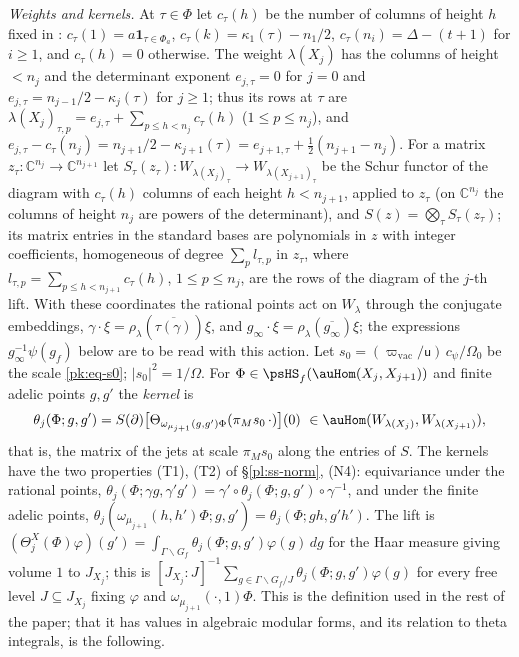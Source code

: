 \documentclass[10pt]{amsart}
\theoremstyle{definition}
\theoremstyle{remark}
\newcommand{\C}{\mathbb C}
\providecommand{\auPa}{\Phi_a}
\providecommand{\auPl}{\Phi}
\providecommand{\aubar}[1]{\overline{#1}}
\begin{document}
\emph{Weights and kernels.} At $\tau\in\auPl$ let $c_\tau(h)$ be the number of columns of height
$h$ fixed in {\cite[\S14.3]{P46}}: $c_\tau(1)=a\mathbf 1_{\tau\in\auPa}$, $c_\tau(k)=\kappa_1(\tau)
-n_1/2$, $c_\tau(n_i)=\Delta-(t+1)$ for $i\ge1$, and $c_\tau(h)=0$ otherwise. The weight
$\lambda(X_j)$ has the columns of height $<n_j$ and the determinant exponent $e_{j,\tau}=0$ for
$j=0$ and $e_{j,\tau}=n_{j-1}/2-\kappa_j(\tau)$ for $j\ge1$; thus its rows at $\tau$ are
$\lambda(X_j)_{\tau,p}=e_{j,\tau}+\sum_{p\le h<n_j}c_\tau(h)$ ($1\le p\le n_j$), and
$e_{j,\tau}-c_\tau(n_j)=n_{j+1}/2-\kappa_{j+1}(\tau)=e_{j+1,\tau}+\tfrac12(n_{j+1}-n_j)$. For a matrix $z_\tau\colon\C^{n_j}\to\C^{n_{j+1}}$ let
$S_\tau(z_\tau)\colon W_{\lambda(X_j)_\tau}\to W_{\lambda(X_{j+1})_\tau}$ be the Schur functor of
the diagram with $c_\tau(h)$ columns of each height $h<n_{j+1}$, applied to $z_\tau$ (on $\C^{n_j}$
the columns of height $n_j$ are powers of the determinant), and $S(z)=\bigotimes_\tau S_\tau
(z_\tau)$; its matrix entries in the standard bases are polynomials in $z$ with integer
coefficients, homogeneous of degree $\sum_pl_{\tau,p}$ in $z_\tau$, where $l_{\tau,p}=\sum_{p\le h<
n_{j+1}}c_\tau(h)$, $1\le p\le n_j$, are the rows of the diagram of the $j$-th lift. With these
coordinates the rational points act on $W_\lambda$ through the conjugate embeddings,
$\gamma\cdot\xi=\rho_\lambda(\aubar{\tau(\gamma)})\xi$, and $g_\infty\cdot\xi=\rho_\lambda(
\aubar{g_\infty})\xi$; the expressions $g_\infty^{-1}\psi(g_f)$ below are to be read with this
action. Let
$s_0=(\varpi_{\mathrm{vac}}/\mathsf u)\,c_\psi/\Omega_0$ be the scale \eqref{pk:eq-s0};
$|s_0|^2=1/\Omega$. For $\Phi\in\psHS_f(\auHom(X_j,X_{j+1}))$
and finite adelic points $g,g'$ the \emph{kernel} is
\begin{equation}\label{ps:eq-kernel}
\theta_j(\Phi;g,g')=S(\partial)\bigl[\Theta_{\omega_{\mu_{j+1}}(g,g')\Phi}(\pi_Ms_0\,\cdot)\bigr](0)
\ \in\auHom(W_{\lambda(X_j)},W_{\lambda(X_{j+1})}),
\end{equation}
that is, the matrix of the jets at scale $\pi_Ms_0$ along the entries of $S$. The kernels have the
two properties (T1), (T2) of \S\ref{pl:ss-norm}, (N4): equivariance under the rational points,
$\theta_j(\Phi;\gamma g,\gamma'g')=\gamma'\circ\theta_j(\Phi;g,g')\circ\gamma^{-1}$, and under the
finite adelic points, $\theta_j(\omega_{\mu_{j+1}}(h,h')\Phi;g,g')=\theta_j(\Phi;gh,g'h')$. The lift is
$(\Theta^X_j(\Phi)\varphi)(g')=\int_{\Gamma\backslash G_f}\theta_j(\Phi;g,g')\varphi(g)\,dg$ for the
Haar measure giving volume $1$ to $J_{X_j}$; this is $[J_{X_j}:J]^{-1}\sum_{g\in\Gamma\backslash
G_f/J}\theta_j(\Phi;g,g')\varphi(g)$ for every free level $J\subseteq J_{X_j}$ fixing $\varphi$ and
$\omega_{\mu_{j+1}}(\cdot,1)\Phi$. This is the definition used in the rest of the paper; that it has
values in algebraic modular forms, and its relation to theta integrals, is the following.
\end{document}
